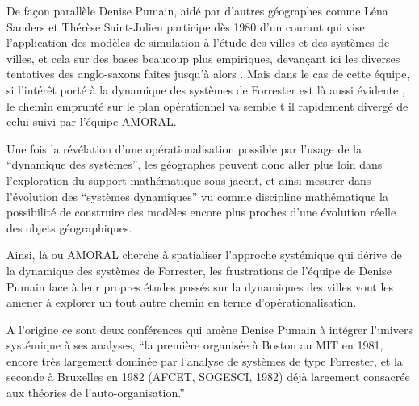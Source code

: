 
De façon parallèle Denise Pumain, aidé par d'autres géographes comme Léna Sanders et Thérèse Saint-Julien participe dès 1980 d'un courant \autocite{Pumain1983, Pumain1984, Pumain1989} qui vise l'application des modèles de simulation à l'étude des villes et des systèmes de villes, et cela sur des bases beaucoup plus empiriques, devançant ici les diverses tentatives des anglo-saxons faites jusqu'à alors \autocite[99-100]{Pumain1989}. Mais dans le cas de cette équipe, si l’intérêt porté à la dynamique des systèmes de Forrester est là aussi évidente \autocite{Pumain1983, Pumain1984}, le chemin emprunté sur le plan opérationnel va semble t il rapidement divergé de celui suivi par l'équipe AMORAL. 

Une fois la révélation d'une opérationalisation possible par l'usage de la \enquote{dynamique des systèmes}, les géographes peuvent donc aller plus loin dans l'exploration du support mathématique sous-jacent, et ainsi mesurer dans l'évolution des \enquote{systèmes dynamiques} vu comme discipline mathématique la possibilité de construire des modèles encore plus proches d'une évolution réelle des objets géographiques.

Ainsi, là ou AMORAL cherche à spatialiser l'approche systémique qui dérive de la dynamique des systèmes de Forrester, les frustrations de l'équipe de Denise Pumain face à leur propres études passés sur la dynamiques des villes vont les amener à explorer un tout autre chemin en terme d'opérationalisation.

A l'origine ce sont deux conférences qui amène Denise Pumain à intégrer l'univers systémique à ses analyses, \enquote{la première organisée à Boston au MIT en 1981, encore très largement dominée par l’analyse de systèmes de type Forrester, et la seconde à Bruxelles en 1982 (AFCET, SOGESCI, 1982) déjà largement consacrée aux théories de l’auto-organisation.} \textcite[27]{Pumain2003} \autocites[27]{Pumain2003}{Schmid2014} 

